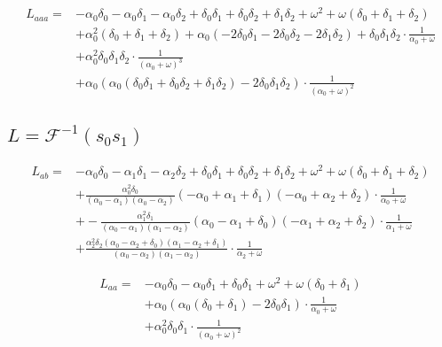 \documentclass[a4paper,10pt]{article}
\begin{document}
\begin{align*}
 L_{aaa}  =&- \alpha_{0} \delta_{0} - \alpha_{0} \delta_{1} - \alpha_{0} \delta_{2} + \delta_{0} \delta_{1} + \delta_{0} \delta_{2} + \delta_{1} \delta_{2} + \omega^{2} + \omega \left(\delta_{0} + \delta_{1} + \delta_{2}\right)\\
&+ \alpha_{0}^{2} \left(\delta_{0} + \delta_{1} + \delta_{2}\right) + \alpha_{0} \left(- 2 \delta_{0} \delta_{1} - 2 \delta_{0} \delta_{2} - 2 \delta_{1} \delta_{2}\right) + \delta_{0} \delta_{1} \delta_{2} \cdot \frac{1}{\alpha_{0} + \omega}\\
&+ \alpha_{0}^{2} \delta_{0} \delta_{1} \delta_{2} \cdot \frac{1}{\left(\alpha_{0} + \omega\right)^{3}}\\
&+ \alpha_{0} \left(\alpha_{0} \left(\delta_{0} \delta_{1} + \delta_{0} \delta_{2} + \delta_{1} \delta_{2}\right) - 2 \delta_{0} \delta_{1} \delta_{2}\right) \cdot \frac{1}{\left(\alpha_{0} + \omega\right)^{2}}
\end{align*}
\subsection{$L = \mathcal{F}^{-1}(s_{0} s_{1})$}

\begin{align*}
 L_{ab}  =&- \alpha_{0} \delta_{0} - \alpha_{1} \delta_{1} - \alpha_{2} \delta_{2} + \delta_{0} \delta_{1} + \delta_{0} \delta_{2} + \delta_{1} \delta_{2} + \omega^{2} + \omega \left(\delta_{0} + \delta_{1} + \delta_{2}\right)\\
&+ \frac{\alpha_{0}^{2} \delta_{0}}{\left(\alpha_{0} - \alpha_{1}\right) \left(\alpha_{0} - \alpha_{2}\right)} \left(- \alpha_{0} + \alpha_{1} + \delta_{1}\right) \left(- \alpha_{0} + \alpha_{2} + \delta_{2}\right) \cdot \frac{1}{\alpha_{0} + \omega}\\
&+ - \frac{\alpha_{1}^{2} \delta_{1}}{\left(\alpha_{0} - \alpha_{1}\right) \left(\alpha_{1} - \alpha_{2}\right)} \left(\alpha_{0} - \alpha_{1} + \delta_{0}\right) \left(- \alpha_{1} + \alpha_{2} + \delta_{2}\right) \cdot \frac{1}{\alpha_{1} + \omega}\\
&+ \frac{\alpha_{2}^{2} \delta_{2} \left(\alpha_{0} - \alpha_{2} + \delta_{0}\right) \left(\alpha_{1} - \alpha_{2} + \delta_{1}\right)}{\left(\alpha_{0} - \alpha_{2}\right) \left(\alpha_{1} - \alpha_{2}\right)} \cdot \frac{1}{\alpha_{2} + \omega}
\end{align*}

\begin{align*}
 L_{aa}  =&- \alpha_{0} \delta_{0} - \alpha_{0} \delta_{1} + \delta_{0} \delta_{1} + \omega^{2} + \omega \left(\delta_{0} + \delta_{1}\right)\\
&+ \alpha_{0} \left(\alpha_{0} \left(\delta_{0} + \delta_{1}\right) - 2 \delta_{0} \delta_{1}\right) \cdot \frac{1}{\alpha_{0} + \omega}\\
&+ \alpha_{0}^{2} \delta_{0} \delta_{1} \cdot \frac{1}{\left(\alpha_{0} + \omega\right)^{2}}
\end{align*}
\end{document}

